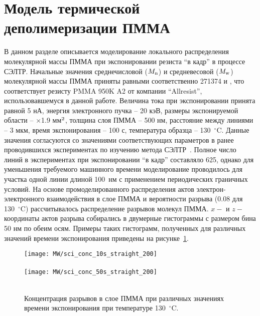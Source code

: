 \section{Модель термической деполимеризации ПММА}

В данном разделе описывается моделирование локального распределения молекулярной массы ПММА при экспонировании резиста ``в кадр'' в процессе СЭЛТР. Начальные значения среднечисловой ($M_\mathrm{n}$) и средневесовой ($M_\mathrm{w}$) молекулярной массы ПММА приняты равными соответственно 271374 и , что соответствует резисту PMMA 950K A2 от компании ``Allresist'', использовавшемуся в данной работе. Величина тока при экспонировании принята равной 5 нА, энергия электронного пучка -- 20 кэВ, размеры экспонируемой области -- $\times$1.9 мм$^\text{2}$, толщина слоя ПММА -- 500 нм, расстояние между линиями -- 3 мкм, время экспонирования -- 100 с, температура образца -- 130~$^\circ$C. Данные значения согласуются со значениями соответствующих параметров в ранее проводившихся экспериментах по изучению метода СЭЛТР~\cite{Bruk_2016_mee}. Полное число линий в экспериментах при экспонировании ``в кадр'' составляло 625, однако для уменьшения требуемого машинного времени моделирование проводилось для участка одной линии длиной 100~нм с применением периодических граничных условий. На основе промоделированного распределения актов электрон-электронного взаимодействия в слое ПММА и вероятности разрыва (0.08 для 130~$^\circ$C) рассчитывалось распределение разрывов молекул ПММА. $x-$ и $z-$координаты актов разрыва собирались в двумерные гистограммы с размером бина 50 нм по обеим осям. Примеры таких гистограмм, полученных для различных значений времени экспонирования приведены на рисунке~\ref{fig:scission_hist}.

\begin{figure}[t]
	\begin{center}
		\texttt{[image: MW/sci\_conc\_10s\_straight\_200]} \\
		\vspace{-3.7em}  \vspace{2.7em} \\
		\texttt{[image: MW/sci\_conc\_50s\_straight\_200]} \\
		\vspace{-3.7em}  \vspace{3.7em} \\
	\end{center}
	\vspace{-2.5em}
	\caption{Концентрация разрывов в слое ПММА при различных значениях времени экспонирования при температуре 130~$^\circ$C.}
	\label{fig:scission_hist}
\end{figure}

